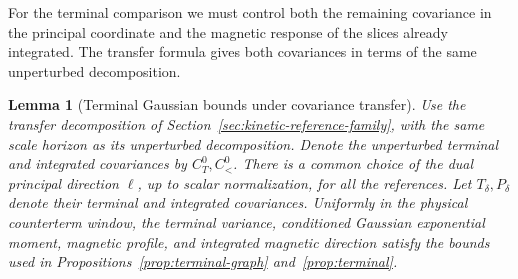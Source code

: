 \documentclass[11pt]{article}
\newtheorem{lemma}[theorem]{Lemma}
\theoremstyle{definition}
\begin{document}
For the terminal comparison we must control both the remaining
covariance in the principal coordinate and the magnetic response of
the slices already integrated. The transfer formula gives both
covariances in terms of the same unperturbed decomposition.
\begin{lemma}[Terminal Gaussian bounds under covariance transfer]
\label{lem:kinetic-reference-terminal}
Use the transfer decomposition of
Section~\ref{sec:kinetic-reference-family}, with the same
scale horizon as its unperturbed decomposition. Denote the
unperturbed terminal and integrated covariances by \(C_T^0,C_<^0\).
There is a common choice of the dual principal direction
\(\ell\), up to scalar normalization, for all the references.
Let \(T_\delta,P_\delta\) denote their terminal and integrated
covariances. Uniformly in the physical counterterm window,
the terminal variance, conditioned Gaussian exponential
moment, magnetic profile, and integrated magnetic direction
satisfy the bounds used in Propositions~\ref{prop:terminal-graph}
and~\ref{prop:terminal}.
\end{lemma}
\end{document}
